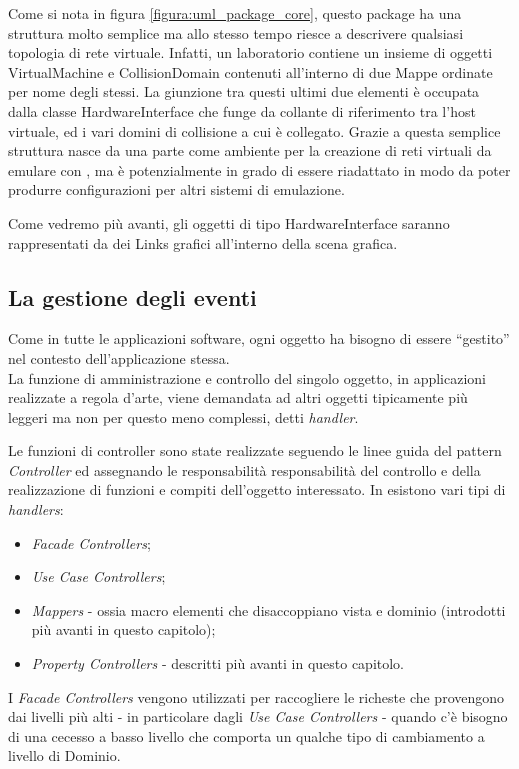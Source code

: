 Come si nota in figura \ref{figura:uml_package_core}, questo package ha una struttura molto semplice ma allo stesso tempo riesce a descrivere qualsiasi topologia di rete virtuale. Infatti, un laboratorio contiene un insieme di oggetti VirtualMachine e CollisionDomain contenuti all'interno di due Mappe ordinate per nome degli stessi. La giunzione tra questi ultimi due elementi è occupata dalla classe HardwareInterface che funge da collante di riferimento tra l'host virtuale, ed i vari domini di collisione a cui è collegato.
Grazie a questa semplice struttura \visualnetkit{} nasce da una parte come ambiente per la creazione di reti virtuali da emulare con \netkit{}, ma è potenzialmente in grado di essere riadattato in modo da poter produrre configurazioni per altri sistemi di emulazione.

Come vedremo più avanti, gli oggetti di tipo HardwareInterface saranno rappresentati da dei Links grafici all'interno della scena grafica.

\subsection{La gestione degli eventi}
Come in tutte le applicazioni software, ogni oggetto ha bisogno di essere ``gestito'' nel contesto dell'applicazione stessa.\\
La funzione di amministrazione e controllo del singolo oggetto, in applicazioni realizzate a regola d'arte, viene demandata ad altri oggetti tipicamente più leggeri ma non per questo meno complessi, detti \emph{handler}.

Le funzioni di controller sono state realizzate seguendo le linee guida del pattern \emph{Controller}\cite{AUPL04} ed assegnando le responsabilità responsabilità del controllo e della realizzazione di funzioni e compiti dell'oggetto interessato. In \visualnetkit{} esistono vari tipi di \emph{handlers}:
\begin{itemize}
\item \emph{Facade Controllers};
\item \emph{Use Case Controllers};
\item \emph{Mappers} - ossia macro elementi che disaccoppiano vista e dominio (introdotti più avanti in questo capitolo);
\item \emph{Property Controllers} - descritti più avanti in questo capitolo.
\end{itemize}

I \emph{Facade Controllers} vengono utilizzati per raccogliere le richeste che provengono dai livelli più alti - in particolare dagli \emph{Use Case Controllers} - quando c'è bisogno di una cecesso a basso livello che comporta un qualche tipo di cambiamento a livello di Dominio.

